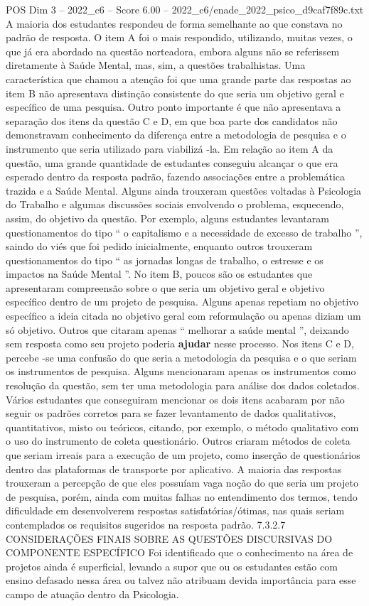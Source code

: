 \begin{textsample}{POS Dim 3 – 2022\_c6 – Score 6.00 – 2022\_c6/enade\_2022\_psico\_d9caf7f89c.txt}
A maioria dos estudantes respondeu de forma semelhante ao que constava no padrão de resposta.
O item A foi o mais respondido, utilizando, muitas vezes, o que já era abordado na questão norteadora, embora alguns não se referissem diretamente à Saúde Mental, mas, sim, a questões trabalhistas.
Uma característica que chamou a atenção foi que uma grande parte das respostas ao item B não apresentava distinção consistente do que seria um objetivo geral e específico de uma pesquisa.
Outro ponto importante é que não apresentava a separação dos itens da questão C e D, em que boa parte dos candidatos não demonstravam conhecimento da diferença entre a metodologia de pesquisa e o instrumento que seria utilizado para viabilizá -la.
Em relação ao item A da questão, uma grande quantidade de estudantes conseguiu alcançar o que era esperado dentro da resposta padrão, fazendo associações entre a problemática trazida e a Saúde Mental.
Alguns ainda trouxeram questões voltadas à Psicologia do Trabalho e algumas discussões sociais envolvendo o problema, esquecendo, assim, do objetivo da questão.
Por exemplo, alguns estudantes levantaram questionamentos do tipo “ o capitalismo e a necessidade de excesso de trabalho ”, saindo do viés que foi pedido inicialmente, enquanto outros trouxeram questionamentos do tipo “ as jornadas longas de trabalho, o estresse e os impactos na Saúde Mental ”.
No item B, poucos são os estudantes que apresentaram compreensão sobre o que seria um objetivo geral e objetivo específico dentro de um projeto de pesquisa.
Alguns apenas repetiam no objetivo específico a ideia citada no objetivo geral com reformulação ou apenas diziam um só objetivo.
Outros que citaram apenas “ melhorar a saúde mental ”, deixando sem resposta como seu projeto poderia \textbf{ajudar} nesse processo.
Nos itens C e D, percebe -se uma confusão do que seria a metodologia da pesquisa e o que seriam os instrumentos de pesquisa.
Alguns mencionaram apenas os instrumentos como resolução da questão, sem ter uma metodologia para análise dos dados coletados.
Vários estudantes que conseguiram mencionar os dois itens acabaram por não seguir os padrões corretos para se fazer levantamento de dados qualitativos, quantitativos, misto ou teóricos, citando, por exemplo, o método qualitativo com o uso do instrumento de coleta questionário.
Outros criaram métodos de coleta que seriam irreais para a execução de um projeto, como inserção de questionários dentro das plataformas de transporte por aplicativo.
A maioria das respostas trouxeram a percepção de que eles possuíam vaga noção do que seria um projeto de pesquisa, porém, ainda com muitas falhas no entendimento dos termos, tendo dificuldade em desenvolverem respostas satisfatórias/ótimas, nas quais seriam contemplados os requisitos sugeridos na resposta padrão. 7.3.2.7 CONSIDERAÇÕES FINAIS SOBRE AS QUESTÕES DISCURSIVAS DO COMPONENTE ESPECÍFICO Foi identificado que o conhecimento na área de projetos ainda é superficial, levando a supor que ou os estudantes estão com ensino defasado nessa área ou talvez não atribuam devida importância para esse campo de atuação dentro da Psicologia.

\end{textsample}

